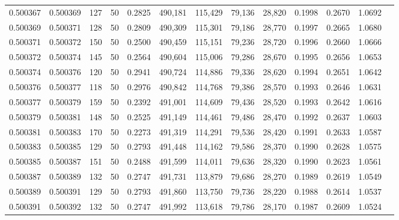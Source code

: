\begin{tabular}{rrrrrrrrrrrrr}
0.500367 & 0.500369 & 127 &  50 &                                     0.2825 & 490,181 & 115,429 &  79,136 &  28,820 & 0.1998 & 0.2670 & 1.0692 \\
0.500369 & 0.500371 & 128 &  50 &                                     0.2809 & 490,309 & 115,301 &  79,186 &  28,770 & 0.1997 & 0.2665 & 1.0680 \\
0.500371 & 0.500372 & 150 &  50 &                                     0.2500 & 490,459 & 115,151 &  79,236 &  28,720 & 0.1996 & 0.2660 & 1.0666 \\
0.500372 & 0.500374 & 145 &  50 &                                     0.2564 & 490,604 & 115,006 &  79,286 &  28,670 & 0.1995 & 0.2656 & 1.0653 \\
0.500374 & 0.500376 & 120 &  50 &                                     0.2941 & 490,724 & 114,886 &  79,336 &  28,620 & 0.1994 & 0.2651 & 1.0642 \\
0.500376 & 0.500377 & 118 &  50 &                                     0.2976 & 490,842 & 114,768 &  79,386 &  28,570 & 0.1993 & 0.2646 & 1.0631 \\
0.500377 & 0.500379 & 159 &  50 &                                     0.2392 & 491,001 & 114,609 &  79,436 &  28,520 & 0.1993 & 0.2642 & 1.0616 \\
0.500379 & 0.500381 & 148 &  50 &                                     0.2525 & 491,149 & 114,461 &  79,486 &  28,470 & 0.1992 & 0.2637 & 1.0603 \\
0.500381 & 0.500383 & 170 &  50 &                                     0.2273 & 491,319 & 114,291 &  79,536 &  28,420 & 0.1991 & 0.2633 & 1.0587 \\
0.500383 & 0.500385 & 129 &  50 &                                     0.2793 & 491,448 & 114,162 &  79,586 &  28,370 & 0.1990 & 0.2628 & 1.0575 \\
0.500385 & 0.500387 & 151 &  50 &                                     0.2488 & 491,599 & 114,011 &  79,636 &  28,320 & 0.1990 & 0.2623 & 1.0561 \\
0.500387 & 0.500389 & 132 &  50 &                                     0.2747 & 491,731 & 113,879 &  79,686 &  28,270 & 0.1989 & 0.2619 & 1.0549 \\
0.500389 & 0.500391 & 129 &  50 &                                     0.2793 & 491,860 & 113,750 &  79,736 &  28,220 & 0.1988 & 0.2614 & 1.0537 \\
0.500391 & 0.500392 & 132 &  50 &                                     0.2747 & 491,992 & 113,618 &  79,786 &  28,170 & 0.1987 & 0.2609 & 1.0524 \\

\end{tabular}
